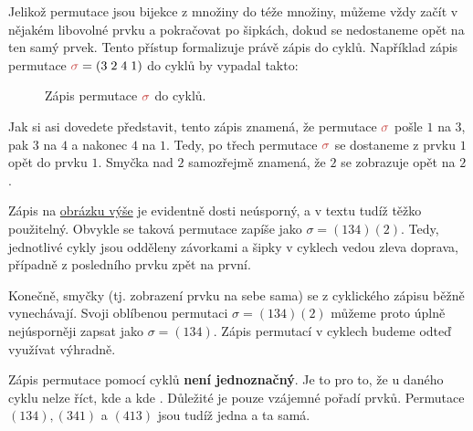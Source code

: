 Jelikož permutace jsou bijekce z množiny do téže množiny, můžeme vždy začít v
nějakém libovolné prvku a pokračovat po šipkách, dokud se nedostaneme opět na
ten samý prvek. Tento přístup formalizuje právě zápis do cyklů. Například
zápis permutace $\clr{\sigma} = (3\;2\;4\;1)$ do cyklů by vypadal takto:
\begin{figure}[h]
 \centering
 \label{fig:permutace-jako-cyklus}
 \caption{Zápis permutace $\clr{\sigma}$ do cyklů.}
\end{figure}

Jak si asi dovedete představit, tento zápis znamená, že permutace $\clr{\sigma}$
pošle $1$ na $3$, pak $3$ na $4$ a nakonec $4$ na $1$. Tedy, po třech
 permutace $\clr{\sigma}$ se dostaneme z prvku $1$ opět do prvku
$1$. Smyčka nad $2$ samozřejmě znamená, že $2$ se zobrazuje opět na $2$.

Zápis na \hyperref[fig:permutace-jako-cyklus]{obrázku výše} je evidentně dosti
neúsporný, a v textu tudíž těžko použitelný. Obvykle se taková permutace zapíše
jako $\sigma = (134)(2)$. Tedy, jednotlivé cykly jsou odděleny závorkami a šipky
v cyklech vedou zleva doprava, případně z posledního prvku zpět na první.

Konečně, smyčky (tj. zobrazení prvku na sebe sama) se z cyklického zápisu běžně
vynechávají. Svoji oblíbenou permutaci $\sigma = (134)(2)$ můžeme proto úplně
nejúsporněji zapsat jako $\sigma = (134)$. Zápis permutací v cyklech budeme
odteď využívat výhradně.

\begin{warning}
 Zápis permutace pomocí cyklů \textbf{není jednoznačný}. Je to pro to, že u
 daného cyklu nelze říct, kde  a kde . Důležité je pouze
 vzájemné pořadí prvků. Permutace $(134), (341)$ a $(413)$ jsou tudíž jedna a ta
 samá.
\end{warning}


